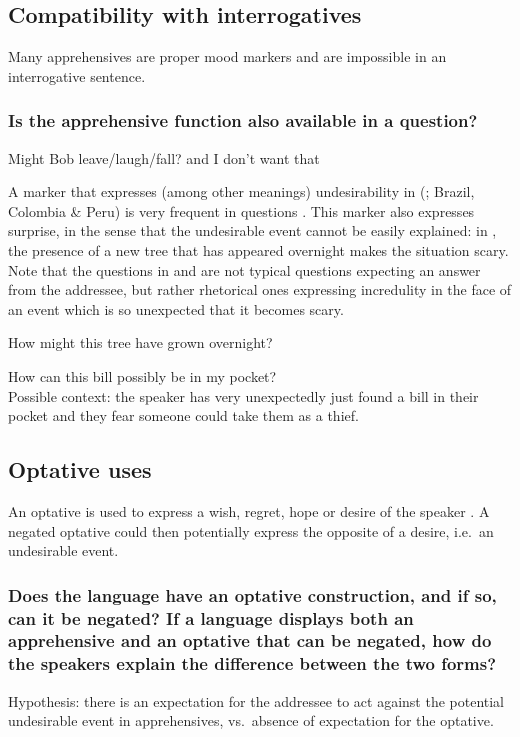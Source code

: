 \documentclass[output=paper,colorlinks,citecolor=brown]{langscibook}
\begin{document}
\subsection{Compatibility with interrogatives}
\label{subsec:apprinterrogatives}

Many apprehensives are proper mood markers and are impossible in an interrogative sentence.

\subsubsection{Is the apprehensive function also available in a question?}
\label{1.8.1}

\ea \label{p34} Might Bob leave\textnormal{/}laugh\textnormal{/}fall? {\op}\textnormal{and I don't want that}{\cp}
\z

A marker that expresses (among other meanings) undesirability in  (; Brazil, Colombia \& Peru) is very frequent in questions \citep[415--417]{Vallejosyopán2016}. This marker also expresses surprise, in the sense that the undesirable event cannot be easily explained: in , the presence of a new tree that has appeared overnight makes the situation scary. Note that the questions in  and  are not typical questions expecting an answer from the addressee, but rather rhetorical ones expressing incredulity in the face of an event which is so unexpected that it becomes scary.

\ea \label{p35} How might this tree have grown overnight?
\z

\ea \label{p36} How can this bill possibly be in my pocket? \\
\textnormal{Possible context: the speaker has very unexpectedly just found a bill in their pocket and they fear someone could take them as a thief.}
\z



\subsection{Optative uses}
\label{subsec:approptative}

An optative is used to express a wish, regret, hope or desire of the speaker \citep{Grosz2012,dobrushinaetal2013}. A negated optative could then potentially express the opposite of a desire, i.e.\ an undesirable event.

\subsubsection{Does the language have an optative construction, and if so, can it be negated?
If a language displays both an apprehensive and an optative that can be negated, how do the speakers explain the difference between the two forms?} Hypothesis: there is an expectation for the addressee to act against the potential undesirable event in apprehensives, vs.\ absence of expectation for the optative.
\label{1.9.1}
\end{document}
